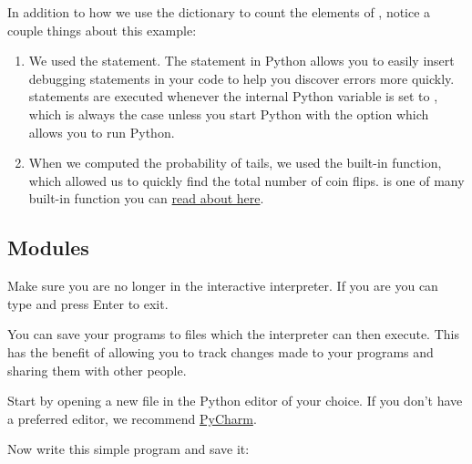 In addition to how we use the dictionary  to count the
elements of , notice a couple things about this example:
\begin{enumerate}
\item {} 
We used the  statement. The 
statement in Python allows you to easily insert debugging
statements in your code to help you discover errors more
quickly.  statements are executed whenever the internal
Python  variable is set to , which is always
the case unless you start Python with the  option which
allows you to run  Python.

\item {} 
When we computed the probability of tails, we used the built-in
 function, which allowed us to quickly find the total number
of coin flips.  is one of many built-in function you can
\href{https://docs.python.org/2/library/functions.html}{read about here}.

\end{enumerate}


\subsection{Modules}
\label{\detokenize{lesson/prg/python_intro:modules}}
Make sure you are no longer in the interactive interpreter.
If you are you can type  and press Enter to exit.

You can save your programs to files which the interpreter can then
execute.  This has the benefit of allowing you to track changes made
to your programs and sharing them with other people.

Start by opening a new file  in the Python editor of your
choice. If you don't have a preferred editor, we recommend \href{https://www.jetbrains.com/pycharm/}{PyCharm}.

Now write this simple program and save it:

\begin{sphinxVerbatim}[commandchars=\\\{\}]
    
\end{sphinxVerbatim}

